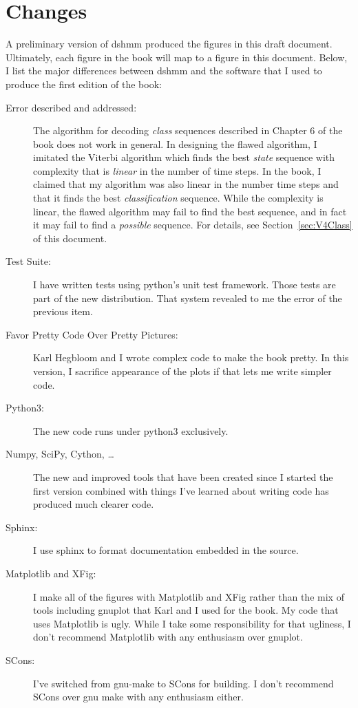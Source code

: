 \documentclass[prelim,showlabels]{book}
\begin{document}
\section*{Changes}
\label{sec:changes}

A preliminary version of dshmm produced the figures in this draft
document.  Ultimately, each figure in the book will map to a figure in
this document.  Below, I list the major differences between dshmm and
the software that I used to produce the first edition of the book:
\begin{description}
\item[Error described and addressed:] The algorithm for decoding
  \emph{class} sequences described in Chapter 6 of the book does not
  work in general.  In designing the flawed algorithm, I imitated the
  Viterbi algorithm which finds the best \emph{state} sequence with
  complexity that is \emph{linear} in the number of time steps.  In
  the book, I claimed that my algorithm was also linear in the number
  time steps and that it finds the best \emph{classification}
  sequence.  While the complexity is linear, the flawed algorithm may
  fail to find the best sequence, and in fact it may fail to find a
  \emph{possible} sequence.  For details, see
  Section~\ref{sec:V4Class} of this document.
\item[Test Suite:] I have written tests using python's unit test
  framework.  Those tests are part of the new distribution.  That
  system revealed to me the error of the previous item.
\item[Favor Pretty Code Over Pretty Pictures:] Karl Hegbloom and I
  wrote complex code to make the book pretty.  In this version, I
  sacrifice appearance of the plots if that lets me write simpler
  code.
\item[Python3:] The new code runs under python3
  exclusively.
\item[Numpy, SciPy, Cython, \ldots] The new and improved tools that
  have been created since I started the first version combined with
  things I've learned about writing code has produced much clearer
  code.
\item[Sphinx:] I use sphinx to format documentation embedded in the
  source.
\item[Matplotlib and XFig:] I make all of the figures with Matplotlib
  and XFig rather than the mix of tools including gnuplot that Karl
  and I used for the book.  My code that uses Matplotlib is ugly.
  While I take some responsibility for that ugliness, I don't
  recommend Matplotlib with any enthusiasm over gnuplot.
\item[SCons:] I've switched from gnu-make to SCons for building.  I
  don't recommend SCons over gnu make with any enthusiasm either.
\end{description}
\end{document}
